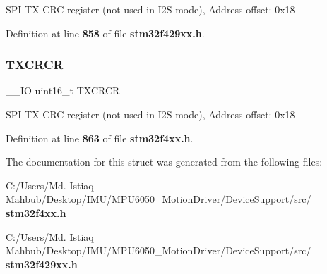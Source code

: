 S\+PI TX C\+RC register (not used in I2S mode), Address offset\+: 0x18 

Definition at line \textbf{ 858} of file \textbf{ stm32f429xx.\+h}.

\mbox{\label{structSPI__TypeDef_a0238d40f977d03709c97033b8379f98f}} 
\subsubsection{T\+X\+C\+R\+CR\hspace{0.1cm}{\footnotesize\ttfamily [2/2]}}
{\footnotesize\ttfamily \+\_\+\+\_\+\+IO uint16\+\_\+t T\+X\+C\+R\+CR}

S\+PI TX C\+RC register (not used in I2S mode), Address offset\+: 0x18 

Definition at line \textbf{ 863} of file \textbf{ stm32f4xx.\+h}.



The documentation for this struct was generated from the following files\+:\begin{DoxyCompactItemize}
\item 
C\+:/\+Users/\+Md. Istiaq Mahbub/\+Desktop/\+I\+M\+U/\+M\+P\+U6050\+\_\+\+Motion\+Driver/\+Device\+Support/src/\textbf{ stm32f4xx.\+h}\item 
C\+:/\+Users/\+Md. Istiaq Mahbub/\+Desktop/\+I\+M\+U/\+M\+P\+U6050\+\_\+\+Motion\+Driver/\+Device\+Support/src/\textbf{ stm32f429xx.\+h}\end{DoxyCompactItemize}
